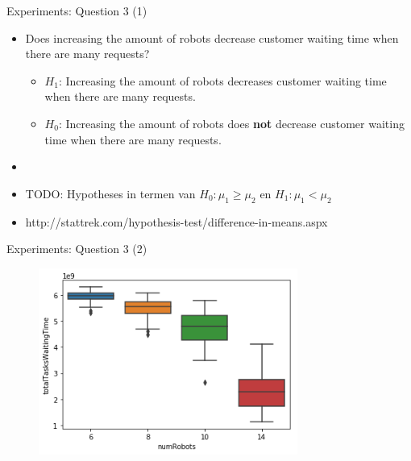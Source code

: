 \begin{frame}{Experiments: Question 3 (1)}
    \begin{itemize}
        \item Does increasing the amount of robots decrease customer waiting time when there are many requests?
        \begin{itemize}
                \item $H_1$: Increasing the amount of robots decreases customer waiting time when there are many requests.
                \item $H_0$: Increasing the amount of robots does \textbf{not} decrease customer waiting time when there are many requests.
        \end{itemize}

        \item[]
        \item TODO: Hypotheses in termen van $H_0: \mu_1 \geq \mu_2$ en $H_1: \mu_1 < \mu_2$
        \item http://stattrek.com/hypothesis-test/difference-in-means.aspx
    \end{itemize}
\end{frame}



\begin{frame}{Experiments: Question 3 (2)}
 \begin{figure}[!hbt]
        \centering
        \includegraphics[width=8.5cm]{imgs/question3-plot1}
    \end{figure}
\end{frame}

